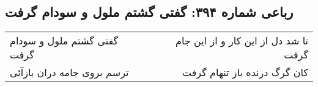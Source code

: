 \begin{center}
\section*{رباعی شماره ۳۹۴: گفتی گشتم ملول و سودام گرفت}
\label{sec:0394}
\begin{longtable}{l p{0.5cm} r}
گفتی گشتم ملول و سودام گرفت
&&
تا شد دل از این کار و از این جام گرفت
\\
ترسم بروی جامه دران بازآئی
&&
کان گرگ درنده باز تنهام گرفت
\\
\end{longtable}
\end{center}
